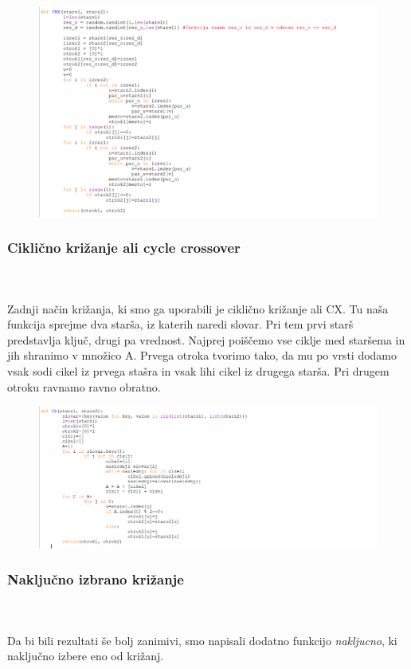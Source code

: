 \documentclass[12pt,a4paper]{amsart}
\theoremstyle{definition} %
\theoremstyle{plain} %
\begin{document}
\begin{figure}[ht]
\centering
\includegraphics[width=1\textwidth]{PMX}
\end{figure}
\newpage
\subsubsection{Ciklično križanje ali cycle crossover}
\
\\
\\
Zadnji način križanja, ki smo ga uporabili je ciklično križanje ali CX. Tu naša funkcija sprejme dva starša, iz katerih naredi slovar. Pri tem prvi starš predstavlja ključ, drugi pa vrednost. Najprej poiščemo vse ciklje med staršema in jih shranimo v množico A. Prvega otroka tvorimo tako, da mu po vrsti dodamo vsak sodi cikel iz prvega stašra in vsak lihi cikel iz drugega starša. Pri drugem otroku ravnamo ravno obratno.  

\begin{figure}[ht]
\centering
\includegraphics[width=1\textwidth]{CX}
\end{figure}

\subsubsection{Naključno izbrano križanje}
\
\\
\\
Da bi bili rezultati še bolj zanimivi, smo napisali dodatno funkcijo \textit{nakljucno}, ki naključno izbere eno od križanj. 
\end{document}
